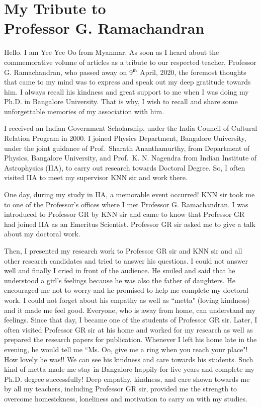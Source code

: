 \chapter[My Tribute to Professor G. Ramachandran]{My Tribute to\\ Professor G. Ramachandran}\label{chap32}

\lhead[\small\thepage]{\small\leftmark}

Hello. I am Yee Yee Oo from Myanmar. As soon as I heard about the commemorative volume of articles as a tribute to our respected teacher, Professor G. Ramachandran, who passed away on 9$^{\rm th}$ April, 2020, the foremost thoughts that came to my mind was to express and speak out my deep gratitude towards him. I always recall his kindness and great support to me when I was doing my Ph.D. in Bangalore University. That is why, I wish to recall and share some unforgettable memories of my association with him.  

I received an Indian Government Scholarship, under the India Council of Cultural Relation Program in 2000. I joined Physics Department, Bangalore University, under the joint guidance of Prof.\ Sharath Ananthamurthy, from Department of Physics, Bangalore University, and Prof.\ K. N. Nagendra from Indian Institute of Astrophysics (IIA), to carry out research towards Doctoral Degree. So, I often visited IIA to meet my supervisor KNN sir and work there. 

One day, during my study in IIA, a memorable event occurred! KNN sir took me to one of the Professor's offices where I met Professor G. Ramachandran. I was introduced to Professor GR by KNN sir and came to know that Professor GR had joined IIA as an Emeritus Scientist. Professor GR sir asked me to give a talk about my doctoral work. 

Then, I presented my research work to Professor GR sir and KNN sir and all other research candidates and tried to answer his questions. I could not answer well and finally I cried in front of the audience. He smiled and said that he understood a girl's feelings because he was also the father of daughters. He encouraged me not to worry and he promised to help me complete my doctoral work.  I could not forget about his empathy as well as ``metta" (loving kindness) and it made me feel good. Everyone, who is away from home, can understand my feelings. Since that day, I became one of the students of Professor GR sir. Later, I often visited Professor GR sir at his home and worked for my research as well as prepared the research papers for publication. Whenever I left his home late in the evening, he would tell me ``Ms. Oo, give me a ring when you reach your place"! How lovely he was!! We can see his kindness and care towards his students. Such kind of metta made me stay in Bangalore happily for five years and complete my Ph.D. degree successfully! Deep empathy, kindness, and care shown towards me by all my teachers, including Professor GR sir, provided me the strength to overcome homesickness, loneliness and motivation to carry on with my studies. 

